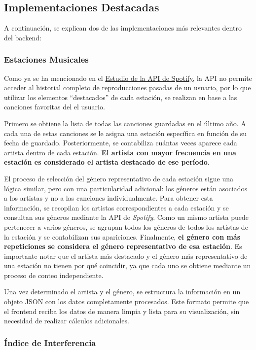 \subsection{Implementaciones Destacadas}
A continuación, se explican dos de las implementaciones más relevantes dentro del backend:

\subsubsection*{Estaciones Musicales}

Como ya se ha mencionado en el \hyperref[sec:estudio_api_tracks]{Estudio de la API de Spotify}, la API no permite acceder al historial completo de reproducciones pasadas de un usuario, por lo que utilizar los elementos ``destacados'' de cada estación, se realizan en base a las canciones favoritas del el usuario.

Primero se obtiene la lista de todas las canciones guardadas en el último año. A cada una de estas canciones se le asigna una estación específica en función de su fecha de guardado. Posteriormente, se contabiliza cuántas veces aparece cada artista dentro de cada estación. \textbf{El artista con mayor frecuencia en una estación es considerado el artista destacado de ese período}.

El proceso de selección del género representativo de cada estación sigue una lógica similar, pero con una particularidad adicional: los géneros están asociados a los artistas y no a las canciones individualmente. Para obtener esta información, se recopilan los artistas correspondientes a cada estación y se consultan sus géneros mediante la API de \textit{Spotify}. Como un mismo artista puede pertenecer a varios géneros, se agrupan todos los géneros de todos los artistas de la estación y se contabilizan sus apariciones. Finalmente, \textbf{el género con más repeticiones se considera el género representativo de esa estación}. Es importante notar que el artista más destacado y el género más representativo de una estación no tienen por qué coincidir, ya que cada uno se obtiene mediante un proceso de conteo independiente.

Una vez determinado el artista y el género, se estructura la información en un objeto JSON con los datos completamente procesados. Este formato permite que el frontend reciba los datos de manera limpia y lista para su visualización, sin necesidad de realizar cálculos adicionales.

\newpage

\subsubsection*{Índice de Interferencia}

